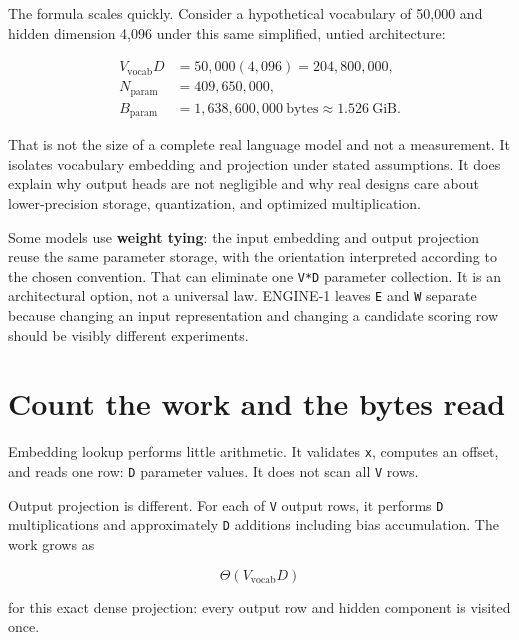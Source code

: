 The formula scales quickly. Consider a hypothetical vocabulary of 50,000
and hidden dimension 4,096 under this same simplified, untied
architecture:

\begin{equation}
\begin{aligned}
V_{\mathrm{vocab}}D&=50{,}000(4{,}096)=204{,}800{,}000,\\
N_{\mathrm{param}}&=409{,}650{,}000,\\
B_{\mathrm{param}}&=1{,}638{,}600{,}000\ \mathrm{bytes}
\approx1.526\ \mathrm{GiB}.
\end{aligned}
\end{equation}

That is not the size of a complete real language model and not a
measurement. It isolates vocabulary embedding and projection under
stated assumptions. It does explain why output heads are not negligible
and why real designs care about lower-precision storage, quantization,
and optimized multiplication.

Some models use \textbf{weight tying}: the input embedding and output
projection reuse the same parameter storage, with the orientation
interpreted according to the chosen convention. That can eliminate one
\texttt{V*D} parameter collection. It is an architectural option, not a
universal law. ENGINE-1 leaves \texttt{E} and \texttt{W} separate
because changing an input representation and changing a candidate
scoring row should be visibly different experiments.

\section{Count the work and the bytes
read}\label{count-the-work-and-the-bytes-read}

Embedding lookup performs little arithmetic. It validates \texttt{x},
computes an offset, and reads one row: \texttt{D} parameter values. It
does not scan all \texttt{V} rows.

Output projection is different. For each of \texttt{V} output rows, it
performs \texttt{D} multiplications and approximately \texttt{D}
additions including bias accumulation. The work grows as

\begin{equation}
\Theta\!\left(V_{\mathrm{vocab}}D\right)
\end{equation}

for this exact dense projection: every output row and hidden component
is visited once.


